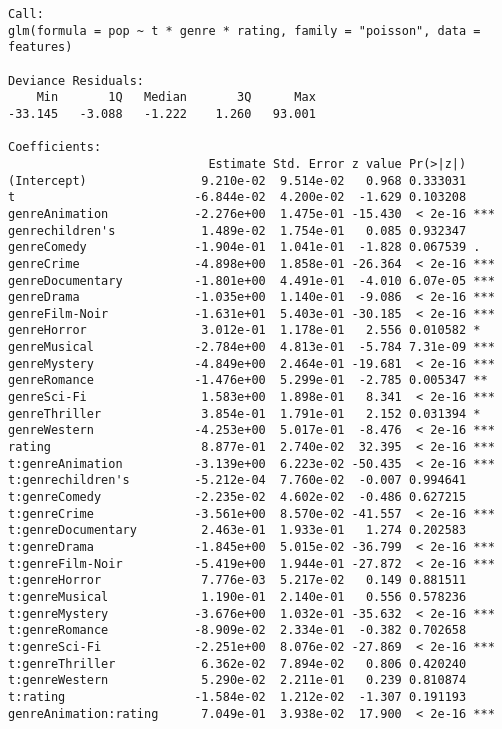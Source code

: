 \begin{verbatim}
Call:
glm(formula = pop ~ t * genre * rating, family = "poisson", data = features)

Deviance Residuals:
    Min       1Q   Median       3Q      Max
-33.145   -3.088   -1.222    1.260   93.001

Coefficients:
                            Estimate Std. Error z value Pr(>|z|)
(Intercept)                9.210e-02  9.514e-02   0.968 0.333031
t                         -6.844e-02  4.200e-02  -1.629 0.103208
genreAnimation            -2.276e+00  1.475e-01 -15.430  < 2e-16 ***
genrechildren's            1.489e-02  1.754e-01   0.085 0.932347
genreComedy               -1.904e-01  1.041e-01  -1.828 0.067539 .
genreCrime                -4.898e+00  1.858e-01 -26.364  < 2e-16 ***
genreDocumentary          -1.801e+00  4.491e-01  -4.010 6.07e-05 ***
genreDrama                -1.035e+00  1.140e-01  -9.086  < 2e-16 ***
genreFilm-Noir            -1.631e+01  5.403e-01 -30.185  < 2e-16 ***
genreHorror                3.012e-01  1.178e-01   2.556 0.010582 *
genreMusical              -2.784e+00  4.813e-01  -5.784 7.31e-09 ***
genreMystery              -4.849e+00  2.464e-01 -19.681  < 2e-16 ***
genreRomance              -1.476e+00  5.299e-01  -2.785 0.005347 **
genreSci-Fi                1.583e+00  1.898e-01   8.341  < 2e-16 ***
genreThriller              3.854e-01  1.791e-01   2.152 0.031394 *
genreWestern              -4.253e+00  5.017e-01  -8.476  < 2e-16 ***
rating                     8.877e-01  2.740e-02  32.395  < 2e-16 ***
t:genreAnimation          -3.139e+00  6.223e-02 -50.435  < 2e-16 ***
t:genrechildren's         -5.212e-04  7.760e-02  -0.007 0.994641
t:genreComedy             -2.235e-02  4.602e-02  -0.486 0.627215
t:genreCrime              -3.561e+00  8.570e-02 -41.557  < 2e-16 ***
t:genreDocumentary         2.463e-01  1.933e-01   1.274 0.202583
t:genreDrama              -1.845e+00  5.015e-02 -36.799  < 2e-16 ***
t:genreFilm-Noir          -5.419e+00  1.944e-01 -27.872  < 2e-16 ***
t:genreHorror              7.776e-03  5.217e-02   0.149 0.881511
t:genreMusical             1.190e-01  2.140e-01   0.556 0.578236
t:genreMystery            -3.676e+00  1.032e-01 -35.632  < 2e-16 ***
t:genreRomance            -8.909e-02  2.334e-01  -0.382 0.702658
t:genreSci-Fi             -2.251e+00  8.076e-02 -27.869  < 2e-16 ***
t:genreThriller            6.362e-02  7.894e-02   0.806 0.420240
t:genreWestern             5.290e-02  2.211e-01   0.239 0.810874
t:rating                  -1.584e-02  1.212e-02  -1.307 0.191193
genreAnimation:rating      7.049e-01  3.938e-02  17.900  < 2e-16 ***

\end{verbatim}
